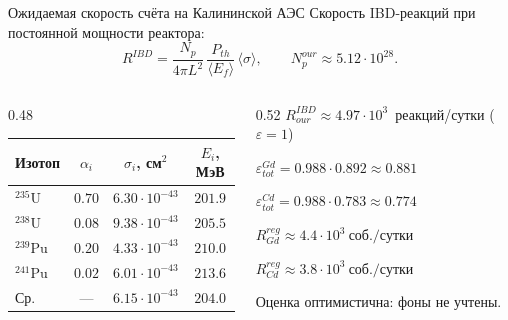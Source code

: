 \documentclass[aspectratio=169,12pt]{beamer}
\begin{document}
\begin{frame}{Ожидаемая скорость счёта на Калининской АЭС}
\small
Скорость IBD-реакций при постоянной мощности реактора:
\begin{equation}
    R^{IBD}=\frac{N_p}{4\pi L^2}\,\frac{P_{th}}{\langle E_f\rangle}\,\langle\sigma\rangle,\qquad N_p^{our}\approx 5.12\cdot 10^{28}.
\end{equation}

\vspace{-0.3em}
\begin{columns}[T]
\begin{column}{0.48\textwidth}
\scriptsize
\begin{tabular}{lccc}
\toprule
Изотоп & $\alpha_i$ & $\sigma_i$, см$^2$ & $E_i$, МэВ \\
\midrule
$^{235}$U  & $0.70$ & $6.30{\cdot}10^{-43}$ & $201.9$ \\
$^{238}$U  & $0.08$ & $9.38{\cdot}10^{-43}$ & $205.5$ \\
$^{239}$Pu & $0.20$ & $4.33{\cdot}10^{-43}$ & $210.0$ \\
$^{241}$Pu & $0.02$ & $6.01{\cdot}10^{-43}$ & $213.6$ \\
\midrule
Ср. & --- & $6.15{\cdot}10^{-43}$ & $204.0$ \\
\bottomrule
\end{tabular}
\end{column}
\begin{column}{0.52\textwidth}
\scriptsize
$R^{IBD}_{our}\approx 4.97\cdot 10^{3}$~реакций/сутки ($\varepsilon=1$)
\smallskip

$\varepsilon_{tot}^{Gd}=0.988\cdot 0.892\approx 0.881$

$\varepsilon_{tot}^{Cd}=0.988\cdot 0.783\approx 0.774$
\smallskip

$\boxed{R^{reg}_{Gd}\approx 4.4\cdot 10^{3}~\text{соб./сутки}}$

$\boxed{R^{reg}_{Cd}\approx 3.8\cdot 10^{3}~\text{соб./сутки}}$
\smallskip

Оценка оптимистична: фоны не учтены.
\end{column}
\end{columns}
\end{frame}
\end{document}

